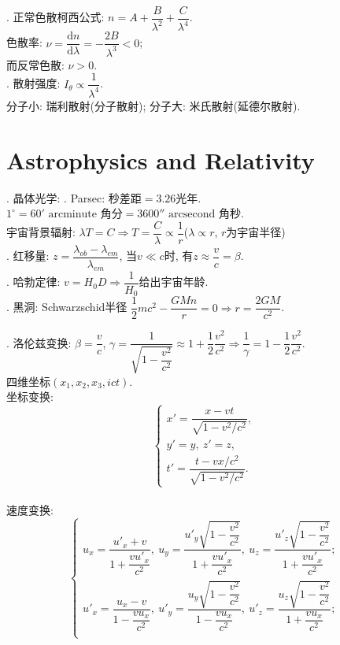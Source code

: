 \documentclass[12pt, 
]{article}
\begin{document}
. 正常色散柯西公式: $n=A+\dfrac{B}{\lambda^2}+\dfrac{C}{\lambda^4}$.
~\\\phantom{~~~~~}色散率: $\nu=\dfrac{\mathrm{d}n}{\mathrm{d}\lambda}=-\dfrac{2B}{\lambda^3}<0$;
~\\\phantom{~~~~~}而反常色散: $\nu>0$.
~\\

. 散射强度: $I_\theta\propto\dfrac{1}{\lambda^4}$.
~\\\phantom{~~~~~}分子小: 瑞利散射(分子散射); 分子大: 米氏散射(延德尔散射).

\newpage
\section{Astrophysics and Relativity}
. 晶体光学:
. Parsec: 秒差距$=3.26$光年.
~\\\phantom{~~~~}$1^\circ=60'\text{~arcminute 角分}=3600''\text{~arcsecond 角秒}$.
~\\\phantom{~~~~}宇宙背景辐射: $\lambda T=C\Rightarrow T=\dfrac{C}{\lambda}\propto\dfrac{1}{r}$($\lambda\propto r$, $r$为宇宙半径)
~\\

. 红移量: $z=\dfrac{\lambda_{ob}-\lambda_{em}}{\lambda_{em}}$, 当$v\ll c$时, 有$z\approx\dfrac{v}{c}=\beta$.
~\\

. 哈勃定律: $v=H_0D\Rightarrow\dfrac{1}{H_0}$给出宇宙年龄.
~\\

. 黑洞: Schwarzschid半径 $\dfrac{1}{2}mc^2-\dfrac{GMn}{r}=0\Rightarrow r=\dfrac{2GM}{c^2}$.
~\\

. 洛伦兹变换: $\beta=\dfrac{v}{c}$, $\gamma=\dfrac{1}{\sqrt{1-\dfrac{v^2}{c^2}}}\approx1+\dfrac{1}{2}\dfrac{v^2}{c^2}\Rightarrow\dfrac{1}{\gamma}=1-\dfrac{1}{2}\dfrac{v^2}{c^2}$.
~\\\phantom{~~~~}四维坐标$(x_1,x_2,x_3,ict)$.
~\\\phantom{~~~~}坐标变换:
\[
	\left\{
		\begin{array}{l}
			x'=\dfrac{x-vt}{\sqrt{1-v^2 / c^2}},\\
			y'=y,~z'=z,\\
			t'=\dfrac{t-vx/c^2}{\sqrt{1-v^2/c^2}}.
		\end{array}
	\right.
\]
~\\\phantom{~~~~}速度变换:
\[
	\left\{
		\begin{array}{l}
			u_x=\dfrac{u'_x+v}{1+\dfrac{vu'_x}{c^2}},~u_y=\dfrac{u'_y\sqrt{1-\dfrac{v^2}{c^2}}}{1+\dfrac{vu'_x}{c^2}},~u_z=\dfrac{u'_z\sqrt{1-\dfrac{v^2}{c^2}}}{1+\dfrac{vu'_x}{c^2}};\\
			u'_x=\dfrac{u_x-v}{1-\dfrac{vu_x}{c^2}},~u'_y=\dfrac{u_y\sqrt{1-\dfrac{v^2}{c^2}}}{1-\dfrac{vu_x}{c^2}},~u'_z=\dfrac{u_z\sqrt{1-\dfrac{v^2}{c^2}}}{1+\dfrac{vu_x}{c^2}};\\
		\end{array}
	\right.
\]
~\\
\end{document}
